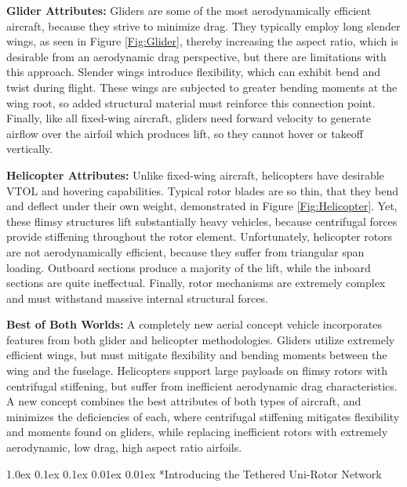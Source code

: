 \documentclass[11pt]{article}
\makeatletter
\renewcommand\subsection{
\@startsection{subsection}{2}{\z@}%
{1.0ex \@plus 0.1ex \@minus 0.1ex}%
{0.01ex \@plus 0.01ex}%
{\normalfont\Large\bfseries}}
\makeatother
\begin{document}
{\bf Glider Attributes:}
Gliders are some of the most aerodynamically efficient aircraft, because they strive to minimize drag.  They typically employ long slender wings, as seen in Figure \ref{Fig:Glider}, thereby increasing the aspect ratio, which is desirable from an aerodynamic drag perspective, but there are limitations with this approach.  Slender wings introduce flexibility, which can exhibit bend and twist during flight.  These wings are subjected to greater bending moments at the wing root, so added structural material must reinforce this connection point.  Finally, like all fixed-wing aircraft, gliders need forward velocity to generate airflow over the airfoil which produces lift, so they cannot hover or takeoff vertically.


{\bf Helicopter Attributes:}
Unlike fixed-wing aircraft, helicopters have desirable VTOL and hovering capabilities.  Typical rotor blades are so thin, that they bend and deflect under their own weight, demonstrated in Figure \ref{Fig:Helicopter}.  Yet, these flimsy structures lift substantially heavy vehicles, because centrifugal forces provide stiffening throughout the rotor element.  Unfortunately, helicopter rotors are not aerodynamically efficient, because they suffer from triangular span loading.  Outboard sections produce a majority of the lift, while the inboard sections are quite ineffectual.  Finally, rotor mechanisms are extremely complex and must withstand massive internal structural forces.


{\bf Best of Both Worlds:}
A completely new aerial concept vehicle incorporates features from both glider and helicopter methodologies.  Gliders utilize extremely efficient wings, but must mitigate flexibility and bending moments between the wing and the fuselage.  Helicopters support large payloads on flimsy rotors with centrifugal stiffening, but suffer from inefficient aerodynamic drag characteristics.  A new concept combines the best attributes of both types of aircraft, and minimizes the deficiencies of each, where centrifugal stiffening mitigates flexibility and moments found on gliders, while replacing inefficient rotors with extremely aerodynamic, low drag, high aspect ratio airfoils.




\subsection*{Introducing the Tethered Uni-Rotor Network}
\end{document}

